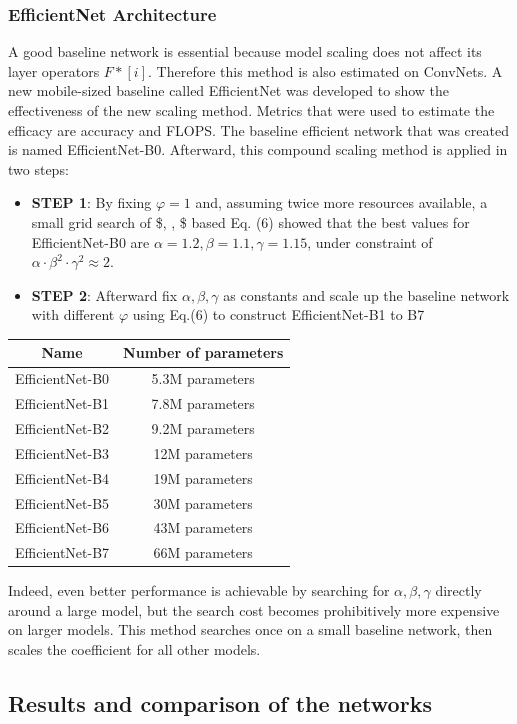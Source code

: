 \documentclass[
]{krantz}
\begin{document}
\hypertarget{efficientnet-architecture}{%
\subsubsection{EfficientNet Architecture}\label{efficientnet-architecture}}

A good baseline network is essential because model scaling does not affect its layer operators \(F*[i]\). Therefore this method is also estimated on ConvNets.
A new mobile-sized baseline called EfficientNet was developed to show the effectiveness of the new scaling method. Metrics that were used to estimate the efficacy are accuracy and FLOPS.
The baseline efficient network that was created is named EfficientNet-B0. Afterward, this compound scaling method is applied in two steps:

\begin{itemize}
\item
  \textbf{STEP 1}: By fixing \(\varphi = 1\) and, assuming twice more resources available, a small grid search of \$\alpha, \beta, \gamma \$ based Eq. (6) showed that the best values for EfficientNet-B0 are \(\alpha = 1.2, \beta = 1.1, \gamma=1.15\), under constraint of \(\alpha·\beta^2·\gamma^2 ≈2\).
\item
  \textbf{STEP 2}: Afterward fix \(\alpha,\beta,\gamma\) as constants and scale up the baseline network with different \(\varphi\) using Eq.(6) to construct EfficientNet-B1 to B7
\end{itemize}

\begin{longtable}[]{@{}cc@{}}
\toprule
Name & Number of parameters\tabularnewline
\midrule
\endhead
EfficientNet-B0 & 5.3M parameters\tabularnewline
EfficientNet-B1 & 7.8M parameters\tabularnewline
EfficientNet-B2 & 9.2M parameters\tabularnewline
EfficientNet-B3 & 12M parameters\tabularnewline
EfficientNet-B4 & 19M parameters\tabularnewline
EfficientNet-B5 & 30M parameters\tabularnewline
EfficientNet-B6 & 43M parameters\tabularnewline
EfficientNet-B7 & 66M parameters\tabularnewline
\bottomrule
\end{longtable}

Indeed, even better performance is achievable by searching for \(\alpha,\beta,\gamma\) directly around a large model, but the search cost becomes prohibitively more expensive on larger models. This method searches once on a small baseline network, then scales the coefficient for all other models.

\hypertarget{results-and-comparison-of-the-networks}{%
\subsection{Results and comparison of the networks}\label{results-and-comparison-of-the-networks}}
\end{document}
